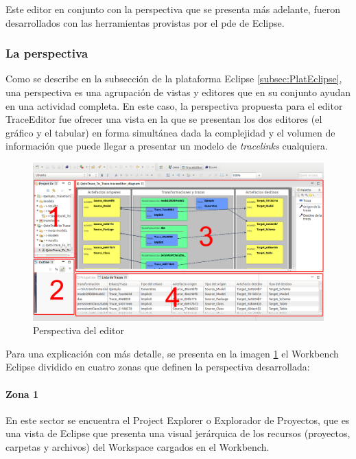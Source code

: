 \documentclass[a4paper,12pt,oneside,spanish]{book}
\begin{document}
Este editor en conjunto con la perspectiva que se presenta más adelante, fueron desarrollados con las herramientas provistas por el \gls{pde} de \textsf{Eclipse}.


\subsubsection{La perspectiva}

Como se describe en la subsección de la plataforma \textsf{Eclipse} \ref{subsec:PlatEclipse}, una perspectiva es una agrupación de vistas y editores que en su conjunto ayudan en una actividad completa. En este caso, la perspectiva propuesta para el editor \textsf{TraceEditor} fue ofrecer una vista en la que se presentan los dos editores (el gráfico y el tabular) en forma simultánea dada la complejidad y el volumen de información que puede llegar a presentar un modelo de \textit{tracelinks} cualquiera.


\begin{figure}[hbtp]
\centering
\includegraphics[scale=.29]{./img/TraceEditorPerspectiva}
\caption{Perspectiva del editor}
\label{fig:TraceEditorPerspectiva}
\end{figure}


Para una explicación con más detalle, se presenta en la imagen \ref{fig:TraceEditorPerspectiva} el Workbench \textsf{Eclipse} dividido en cuatro zonas que definen la perspectiva desarrollada:


\paragraph{Zona 1}
En este sector se encuentra el \textsf{Project Explorer} o Explorador de Proyectos, que es una vista de \textsf{Eclipse} que presenta una visual jerárquica de los recursos (proyectos, carpetas y archivos) del Workspace cargados en el Workbench.
\end{document}
